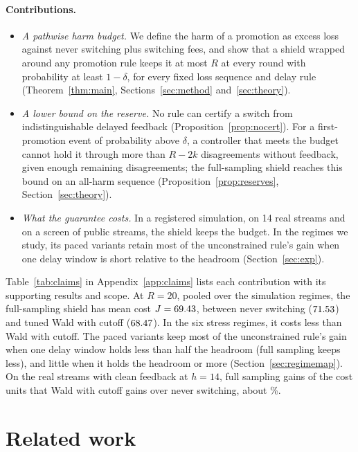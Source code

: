 \documentclass[10pt]{article}
\theoremstyle{plain}
\theoremstyle{definition}
\begin{document}
\paragraph{Contributions.}
\begin{itemize}\setlength\itemsep{0pt}
\item \emph{A pathwise harm budget.} We define the harm of a promotion as excess loss against never switching plus switching fees, and show that a shield wrapped around any promotion rule keeps it at most $R$ at every round with probability at least $1-\delta$, for every fixed loss sequence and delay rule (Theorem~\ref{thm:main}, Sections~\ref{sec:method} and~\ref{sec:theory}).
\item \emph{A lower bound on the reserve.} No rule can certify a switch from indistinguishable delayed feedback (Proposition~\ref{prop:nocert}). For a first-promotion event of probability above $\delta$, a controller that meets the budget cannot hold it through more than $R-2k$ disagreements without feedback, given enough remaining disagreements; the full-sampling shield reaches this bound on an all-harm sequence (Proposition~\ref{prop:reserves}, Section~\ref{sec:theory}).
\item \emph{What the guarantee costs.} In a registered simulation, on 14 real streams and on a screen of \ScreenPool{} public streams, the shield keeps the budget. In the regimes we study, its paced variants retain most of the unconstrained rule's gain when one delay window is short relative to the headroom (Section~\ref{sec:exp}).
\end{itemize}
Table~\ref{tab:claims} in Appendix~\ref{app:claims} lists each contribution with its supporting results and scope.
At $R=20$, pooled over the \NRegimes{} simulation regimes, the full-sampling shield has mean cost $J=69.43$, between never switching ($71.53$) and tuned Wald with cutoff ($68.47$). In the six stress regimes, it costs less than Wald with cutoff. The paced variants keep most of the unconstrained rule's gain when one delay window holds less than half the headroom (full sampling keeps less), and little when it holds the headroom or more (Section~\ref{sec:regimemap}). On the real streams with clean feedback at $h=14$, full sampling gains \RealPiVsNeverCleanHfourteen{} of the \RealWaldGain{} cost units that Wald with cutoff gains over never switching, about \RealPiShareFourteen\%.

\section{Related work}
\end{document}

